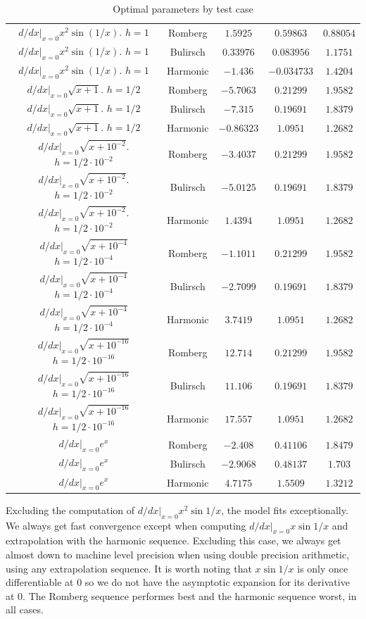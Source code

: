\begin{table}[H]
\begin{tabular}{c|c||c|c|c}
$d/dx|_{x=0} x^2 \sin(1/x)$. $h=1$ & Romberg & \(1.5925\) & \(0.59863\) & \(0.88054\) \\
$d/dx|_{x=0} x^2 \sin(1/x)$. $h=1$ & Bulirsch & \(0.33976\) & \(0.083956\) & \(1.1751\) \\
$d/dx|_{x=0} x^2 \sin(1/x)$. $h=1$ & Harmonic & \(-1.436\) & \(-0.034733\) & \(1.4204\) \\
$d/dx|_{x=0} \sqrt{x + 1}$. $h=1/2$ & Romberg & \(-5.7063\) & \(0.21299\) & \(1.9582\) \\
$d/dx|_{x=0} \sqrt{x + 1}$. $h=1/2$ & Bulirsch & \(-7.315\) & \(0.19691\) & \(1.8379\) \\
$d/dx|_{x=0} \sqrt{x + 1}$. $h=1/2$ & Harmonic & \(-0.86323\) & \(1.0951\) & \(1.2682\) \\
$d/dx|_{x=0}\sqrt{x + 10^{-2}}$. $h=1/2\cdot 10^{-2}$ & Romberg & \(-3.4037\) & \(0.21299\) & \(1.9582\) \\
$d/dx|_{x=0}\sqrt{x + 10^{-2}}$. $h=1/2\cdot 10^{-2}$ & Bulirsch & \(-5.0125\) & \(0.19691\) & \(1.8379\) \\
$d/dx|_{x=0}\sqrt{x + 10^{-2}}$. $h=1/2\cdot 10^{-2}$ & Harmonic & \(1.4394\) & \(1.0951\) & \(1.2682\) \\
$d/dx|_{x=0}\sqrt{x + 10^{-4}}$ $h=1/2\cdot 10^{-4}$ & Romberg & \(-1.1011\) & \(0.21299\) & \(1.9582\) \\
$d/dx|_{x=0}\sqrt{x + 10^{-4}}$ $h=1/2\cdot 10^{-4}$ & Bulirsch & \(-2.7099\) & \(0.19691\) & \(1.8379\) \\
$d/dx|_{x=0}\sqrt{x + 10^{-4}}$ $h=1/2\cdot 10^{-4}$ & Harmonic & \(3.7419\) & \(1.0951\) & \(1.2682\) \\
$d/dx|_{x=0}\sqrt{x + 10^{-16}}$ $h=1/2\cdot 10^{-16}$ & Romberg & \(12.714\) & \(0.21299\) & \(1.9582\) \\
$d/dx|_{x=0}\sqrt{x + 10^{-16}}$ $h=1/2\cdot 10^{-16}$ & Bulirsch & \(11.106\) & \(0.19691\) & \(1.8379\) \\
$d/dx|_{x=0}\sqrt{x + 10^{-16}}$ $h=1/2\cdot 10^{-16}$ & Harmonic & \(17.557\) & \(1.0951\) & \(1.2682\) \\
$d/dx|_{x=0}e^x$ & Romberg & \(-2.408\) & \(0.41106\) & \(1.8479\) \\
$d/dx|_{x=0}e^x$ & Bulirsch & \(-2.9068\) & \(0.48137\) & \(1.703\) \\
$d/dx|_{x=0}e^x$ & Harmonic & \(4.7175\) & \(1.5509\) & \(1.3212\) \\
    \end{tabular}
    \caption{Optimal parameters by test case}
    \label{tab:my_label}
\end{table}

Excluding the computation of \(d/dx|_{x=0}x^2\sin 1/x\), the model fits exceptionally. We always get fast convergence except when computing \(d/dx|_{x=0}x\sin 1/x\) and extrapolation with the harmonic sequence. Excluding this case, we always get almost down to machine level precision when using double precision arithmetic, using any extrapolation sequence. It is worth noting that \(x\sin 1/x\) is only once differentiable at \(0\) so we do not have the asymptotic expansion for its derivative at \(0\). The Romberg sequence performes best and the harmonic sequence worst, in all cases.\\
